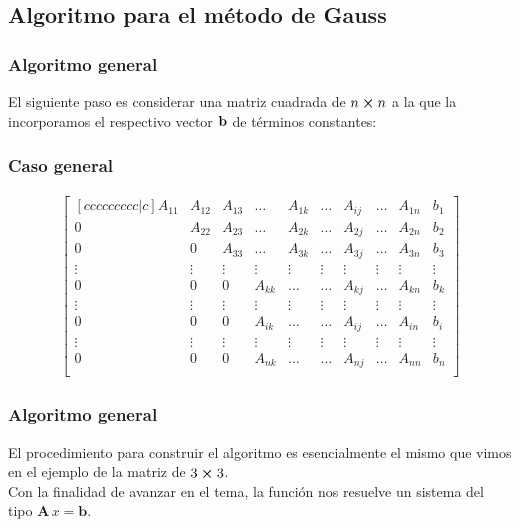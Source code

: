 \subsection{Algoritmo para el método de Gauss}
\begin{frame}
\frametitle{Algoritmo general}
El siguiente paso es considerar una matriz cuadrada de $n \cp n$ a la que la incorporamos el respectivo vector $\vb{b}$ de términos constantes:
\end{frame}
\begin{frame}[fragile]
\frametitle{Caso general}
\fontsize{10}{10}\selectfont
\begin{align*}
\begin{bmatrix}[ccccccccc|c]
A_{11} & A_{12} & A_{13} & \ldots & A_{1k} & \ldots & A_{ij} & \ldots & A_{1n} & b_{1} \\
0      & A_{22} & A_{23} & \ldots & A_{2k} & \ldots & A_{2j} & \ldots & A_{2n} & b_{2} \\
0      & 0      & A_{33} & \ldots & A_{3k} & \ldots & A_{3j} & \ldots & A_{3n} & b_{3} \\
\vdots & \vdots & \vdots & \vdots & \vdots & \vdots & \vdots & \vdots & \vdots & \vdots \\
0      & 0      & 0      & A_{kk} & \ldots & \ldots & A_{kj} & \ldots & A_{kn} & b_{k} \\
\vdots & \vdots & \vdots & \vdots & \vdots & \vdots & \vdots & \vdots & \vdots & \vdots \\
0      & 0      & 0      & A_{ik} & \ldots & \ldots & A_{ij} & \ldots & A_{in} & b_{i} \\
\vdots & \vdots & \vdots & \vdots & \vdots & \vdots & \vdots & \vdots & \vdots & \vdots \\
0      & 0      & 0      & A_{nk} & \ldots & \ldots & A_{nj} & \ldots & A_{nn} & b_{n} \\
\end{bmatrix}
\end{align*}
\end{frame}
\begin{frame}
\frametitle{Algoritmo general}
El procedimiento para construir el algoritmo es esencialmente el mismo que vimos en el ejemplo de la matriz de $3 \cp 3$.
\\
\bigskip
\pause
Con la finalidad de avanzar en el tema, la función  nos resuelve un sistema del tipo $\mathbf{A} \, x =  \mathbf{b}$.
\end{frame}
